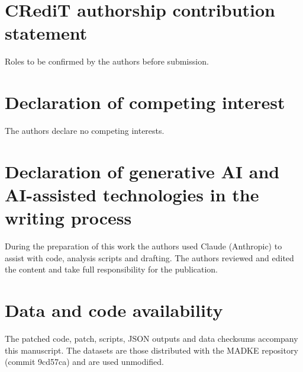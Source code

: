 \section*{CRediT authorship contribution statement}
Roles to be confirmed by the authors before submission.

\section*{Declaration of competing interest}
The authors declare no competing interests.

\section*{Declaration of generative AI and AI-assisted technologies in the writing process}
During the preparation of this work the authors used Claude (Anthropic) to assist with code, analysis scripts and drafting. The authors reviewed and edited the content and take full responsibility for the publication.

\section*{Data and code availability}
The patched code, patch, scripts, JSON outputs and data checksums accompany this manuscript. The datasets are those distributed with the MADKE repository (commit 9cd57ca) and are used unmodified.
